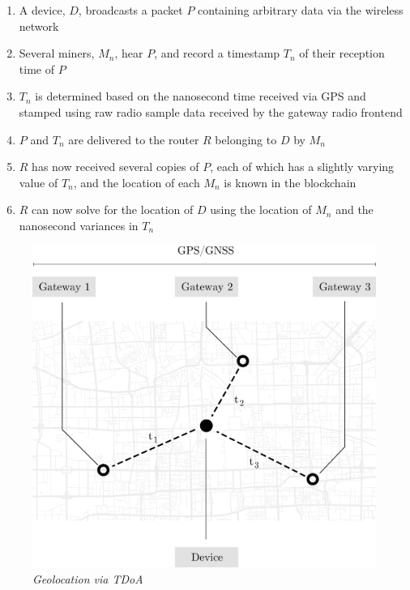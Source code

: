 \documentclass[UTF8, 10pt, nonatbib, nocopyrightspace, reprint]{sigplanconf}
\begin{document}
\begin{enumerate}
        \item A device, $D$, broadcasts a packet $P$ containing arbitrary data via the wireless network
        \item Several miners, $M_n$, hear $P$, and record a timestamp $T_n$ of their reception time of $P$
        \item $T_n$ is determined based on the nanosecond time received via GPS and stamped using raw radio sample data received by the gateway radio frontend
        \item $P$ and $T_n$ are delivered to the router $R$ belonging to $D$ by $M_n$
        \item $R$ has now received several copies of $P$, each of which has a slightly varying value of $T_n$, and the location of each $M_n$ is known in the blockchain
        \item $R$ can now solve for the location of $D$ using the location of $M_n$ and the nanosecond variances in $T_n$
\end{enumerate}

\begin{figure}[H]
    \begin{center}
          \includegraphics[width=\columnwidth]{tdoa.eps}
          \caption{\emph{Geolocation via TDoA}}
          \label{fig:tdoa}
     \end{center}
\end{figure}
\end{document}
